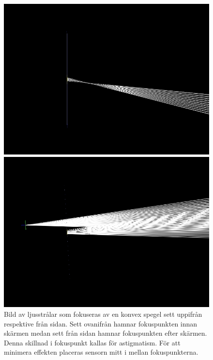 \documentclass[a4paper]{article}
\begin{document}
\FloatBarrier

\begin{figure}[h]
	\centering
	\begin{minipage}[b]{0.4\textwidth}
		\includegraphics[width=\textwidth]{Data/FRED/FRED1.jpg}
	\end{minipage}
	\hspace{10pt}
	\begin{minipage}[b]{0.4\textwidth}
		\includegraphics[width=\textwidth]{Data/FRED/FRED2.jpg}
	\end{minipage}
	\caption{Bild av ljusstrålar som fokuseras av en konvex spegel sett uppifrån respektive från sidan. Sett ovanifrån hamnar fokuspunkten innan skärmen medan sett från sidan hamnar fokuspunkten efter skärmen. Denna skillnad i fokuspunkt kallas för astigmatism. För att minimera effekten placeras sensorn mitt i mellan fokuspunkterna.}
	\label{fig:astigmBoth}
\end{figure}
\end{document}
